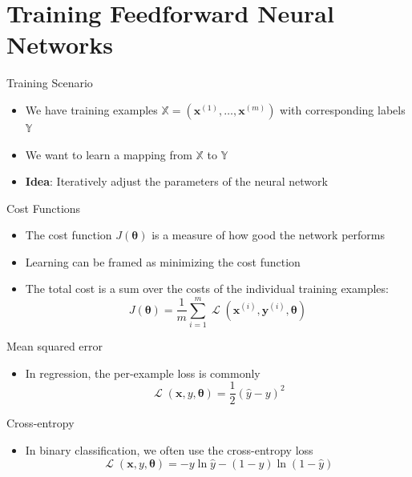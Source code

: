 \documentclass{beamer}
\DeclareMathOperator{\loss}{\mathcal{L}}
\begin{document}
	\section{Training Feedforward Neural Networks}
	\begin{frame}{Training Scenario}
		\begin{itemize}
			\item <1-> We have training examples $\mathbb{X} = (\bm{x}^{(1)}, \ldots, \bm{x}^{(m)})$ with corresponding labels $\mathbb{Y}$
			\item <2-> We want to learn a mapping from $\mathbb{X}$ to $\mathbb{Y}$
			\item <3-> \textbf{Idea}: Iteratively adjust the parameters of the neural network
		\end{itemize}
	\end{frame}
	\begin{frame}{Cost Functions}
		\begin{itemize}
			\item <1-> The cost function $J(\bm{\theta})$ is a measure of how good the network performs
			\item <2-> Learning can be framed as minimizing the cost function
			\item <3-> The total cost is a sum over the costs of the individual training examples:
			\begin{equation}
			J(\bm{\theta}) = \frac1{m}\sum_{i=1}^{m}\loss(\bm{x}^{(i)},\bm{y}^{(i)},\bm{\theta})
			\end{equation}
		\end{itemize}
	\end{frame}
	\begin{frame}{Mean squared error}
		\begin{itemize}
			\item <1-> In regression, the per-example loss is commonly
			\begin{equation}
			\loss(\bm{x}, y, \bm{\theta}) = \frac1{2}(\hat{y}-y)^2
			\end{equation}
		\end{itemize}
	\end{frame}
	\begin{frame}{Cross-entropy}
		\begin{itemize}
			\item <1-> In binary classification, we often use the cross-entropy loss
			\begin{equation}
			\loss(\bm{x}, y, \bm{\theta}) = -y \ln \hat{y} - (1-y)\ln(1-\hat{y})
			\end{equation}
		\end{itemize}
	\end{frame}
\end{document}
